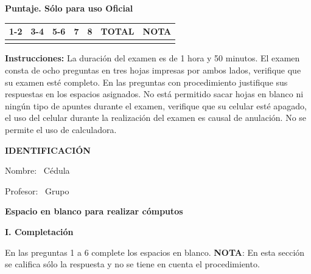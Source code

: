 \documentclass[11pt]{article}
\begin{document}
\examheader

\vspace{4pt}
\noindent
\begin{minipage}[t]{0.62\linewidth}
\textbf{Puntaje. Sólo para uso Oficial}\\[4pt]
\begin{tabular}{|c|c|c|c|c|c|c|}
\hline
1-2 & 3-4 & 5-6 & 7 & 8 & \textbf{TOTAL} & \textbf{NOTA} \\ \hline
 & & & & & & \\ \hline
\end{tabular}
\end{minipage}

\vspace{6pt}
\noindent\textbf{Instrucciones:} La duración del examen es de 1 hora y 50 minutos. El examen consta de ocho preguntas en tres hojas impresas por ambos lados, verifique que su examen esté completo. En las preguntas con procedimiento justifique sus respuestas en los espacios asignados. No está permitido sacar hojas en blanco ni ningún tipo de apuntes durante el examen, verifique que su celular esté apagado, el uso del celular durante la realización del examen es causal de anulación. No se permite el uso de calculadora.

\vspace{6pt}
\noindent\textbf{IDENTIFICACIÓN}

\vspace{8pt}
\noindent Nombre: \dotfill\ Cédula \dotfill

\vspace{4pt}
\noindent Profesor: \dotfill\ Grupo \dotfill

\vspace{6pt}
\begin{center}
\textbf{Espacio en blanco para realizar cómputos}
\end{center}

\newpage
\noindent\textbf{\large I. Completación}

\vspace{2pt}
\noindent En las preguntas 1 a 6 complete los espacios en blanco. \textbf{NOTA}: En esta sección se califica sólo la respuesta y no se tiene en cuenta el procedimiento.
\end{document}
